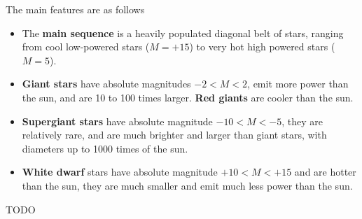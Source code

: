 The main features are as follows
\begin{itemize}
    \item The \textbf{main sequence} is a heavily populated diagonal belt of stars, ranging from cool low-powered stars ($M=+15$) to very hot high powered stars ($M=5$).
    \item \textbf{Giant stars} have absolute magnitudes $-2<M<2$, emit more power than the sun, and are 10 to 100 times larger. \textbf{Red giants} are cooler than the sun.
    \item \textbf{Supergiant stars} have absolute magnitude $-10<M<-5$, they are relatively rare, and are much brighter and larger than giant stars, with diameters up to 1000 times of the sun.
    \item \textbf{White dwarf} stars have absolute magnitude $+10<M<+15$ and are hotter than the sun, they are much smaller and emit much less power than the sun.
\end{itemize}

TODO
